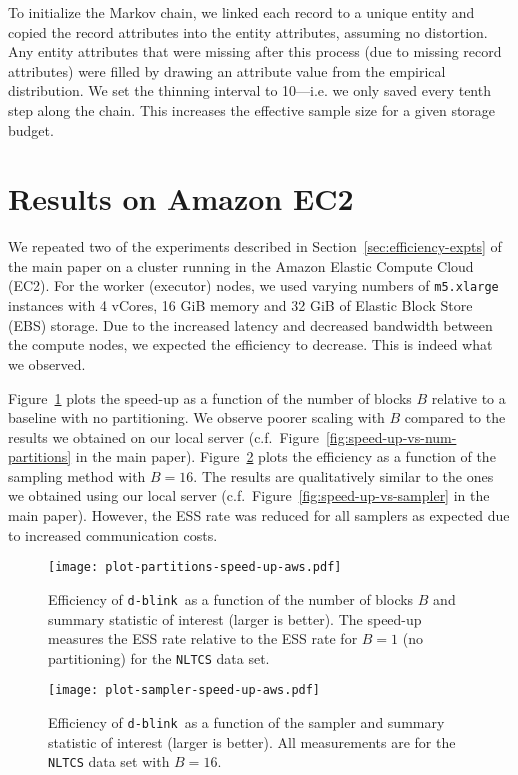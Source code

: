 \documentclass[12pt,letterpaper]{article}
\newcommand{\1}[1]{\mathbb{I}\!\left[#1\right]} %
\newcommand{\dblink}{\texttt{\upshape \lowercase{d-blink}}} %
\begin{document}
To initialize the Markov chain, we linked each record to a unique entity and 
copied the record attributes into the entity attributes, assuming no 
distortion.
Any entity attributes that were missing after this process (due to missing 
record attributes) were filled by drawing an attribute value from the 
empirical distribution.
We set the thinning interval to 10---i.e. we only saved every tenth step along 
the chain.
This increases the effective sample size for a given storage budget.

\section{Results on Amazon EC2}
\label{app-sec:cloud-results}
We repeated two of the experiments described in 
Section~\ref{sec:efficiency-expts} of the main paper on a cluster 
running in the Amazon Elastic Compute Cloud (EC2).
For the worker (executor) nodes, we used varying numbers of \texttt{m5.xlarge} 
instances with 4 vCores, 16 GiB memory and 32 GiB of Elastic Block Store 
(EBS) storage. 
Due to the increased latency and decreased bandwidth between the 
compute nodes, we expected the efficiency to decrease.
This is indeed what we observed.

Figure~\ref{app-fig:speed-up-vs-num-partitions} plots the speed-up as a function 
of the number of blocks $B$ relative to a baseline with no partitioning.
We observe poorer scaling with $B$ compared to the results we obtained 
on our local server (c.f.~Figure~\ref{fig:speed-up-vs-num-partitions} 
in the main paper).
Figure~\ref{app-fig:speed-up-vs-sampler} plots the efficiency as a function of 
the sampling method with $B=16$.
The results are qualitatively similar to the ones we obtained using our local 
server (c.f.~Figure~\ref{fig:speed-up-vs-sampler} in the main paper).
However, the ESS rate was reduced for all samplers as expected due to 
increased communication costs.

\begin{figure}
  \centering
  \texttt{[image: plot-partitions-speed-up-aws.pdf]}
  \caption{Efficiency of \dblink\ as a function of the
    number of blocks $B$ and summary statistic of interest 
    (larger is better).
    The speed-up measures the ESS rate relative to the ESS rate 
    for $B = 1$ (no partitioning) for the \texttt{NLTCS} data set.}
  \label{app-fig:speed-up-vs-num-partitions}
\end{figure}

\begin{figure}
  \centering
  \texttt{[image: plot-sampler-speed-up-aws.pdf]}
  \caption{Efficiency of \dblink\ as a function of the 
    sampler and summary statistic of interest (larger is better).
    All measurements are for the \texttt{NLTCS} data set with 
    $B = 16$.
    }
  \label{app-fig:speed-up-vs-sampler}
\end{figure}
\end{document}
